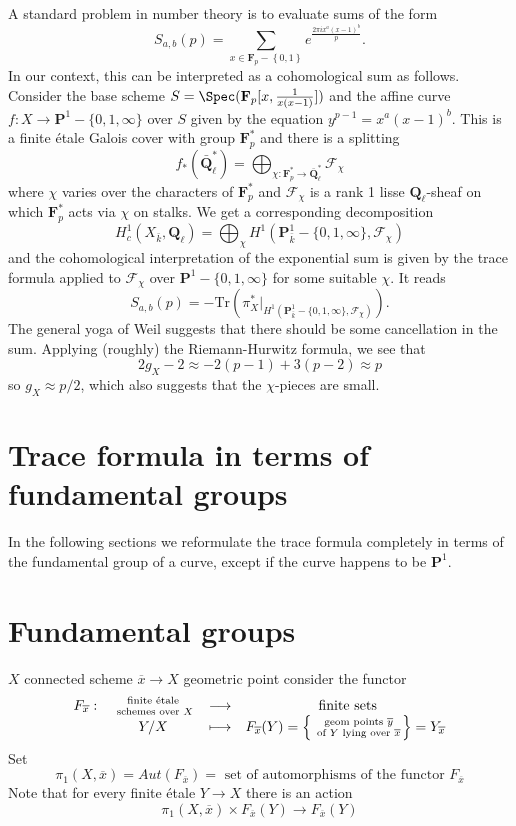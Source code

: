 \noindent
A standard problem in number theory is to evaluate sums of the form
$$
S_{a, b}(p) = \sum_{x\in \mathbf{F}_p-\left\{0, 1\right\}} e^{\frac{2\pi
ix^a(x-1)^b}{p}}.
$$
In our context, this can be interpreted as a cohomological sum as follows.
Consider the base scheme
$S = \Spec(\mathbf{F}_p[x, \frac{1}{x(x-1)}])$ and the affine curve
$f: X \to \mathbf{P}^1-\{0, 1, \infty\}$ over $S$ given by the equation
$y^{p-1} = x^a(x-1)^b$. This is a finite \'etale Galois cover with group
$\mathbf{F}_p^*$ and there is a splitting
$$
f_*(\bar{\mathbf{Q}}_\ell^*) =
\bigoplus_{\chi : \mathbf{F}_p^*\to \bar{\mathbf{Q}}_\ell^*} \mathcal{F}_\chi
$$
where $\chi$ varies over the characters of $\mathbf{F}_p^*$ and
$\mathcal{F}_\chi$ is a rank 1 lisse $\mathbf{Q}_\ell$-sheaf on which
$\mathbf{F}_p^*$ acts via $\chi$ on stalks. We get a corresponding decomposition
$$
H_c^1(X_{\bar k}, \mathbf{Q}_\ell) = \bigoplus_\chi H^1(\mathbf{P}_{\bar
k}^1-\{0, 1, \infty\}, \mathcal{F}_\chi)
$$
and the cohomological interpretation of the exponential sum is given by the
trace formula applied to $\mathcal{F}_\chi$ over $\mathbf{P}^1 - \{0, 1,
\infty\}$ for some suitable $\chi$. It reads
$$
S_{a, b}(p) = -\text{Tr}\left(\pi_X^*\big|_{H^1(\mathbf{P}_{\bar k}^1-\{0, 1,
\infty\}, \mathcal{F}_\chi)}\right).
$$
The general yoga of Weil suggests that there should be some cancellation in the
sum. Applying (roughly) the Riemann-Hurwitz formula, we see that
$$
2g_X-2 \approx -2 (p-1) + 3(p-2) \approx p
$$
so $g_X\approx p/2$, which also suggests that the $\chi$-pieces are small.



\section{Trace formula in terms of fundamental groups}
\label{section-trace-formula-fundamental-group}

\noindent
In the following sections we reformulate the trace formula completely
in terms of the fundamental group of a curve, except if the curve
happens to be $\mathbf{P}^1$.




\section{Fundamental groups}
\label{section-fundamental-groups}

\noindent
$X$ connected scheme $\overline x\to X$ geometric
point consider the functor
$$
\begin{matrix}
F_{\overline x}: &
\text{ finite \'etale }\atop \text{ schemes over } X &
\longrightarrow & \text{ finite sets} \\
&
Y/X &
\longmapsto &
F_{\overline x}(Y) =
\left\{\text{ geom points }\overline y\atop \text{ of } Y
\text{ lying over }\overline x\right\} = Y_{\overline x}
\end{matrix}
$$
Set
$$
\pi_1(X, \overline x)
=
Aut(F_{\overline x})
=
\text{ set of automorphisms of the functor }F_{\overline x}
$$
Note that for every finite \'etale $Y \to X$ there is an action
$$
\pi_1(X, \overline x) \times F_{\overline x}(Y) \to F_{\overline x}(Y)
$$

